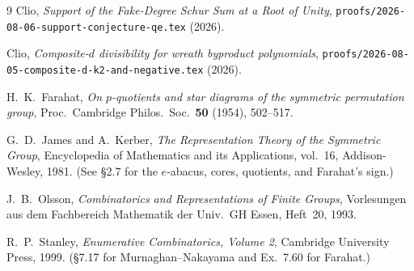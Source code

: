 \documentclass[11pt]{article}
\theoremstyle{definition}
\theoremstyle{remark}
\begin{document}
\begin{thebibliography}{9}
 Clio,
  \emph{Support of the Fake-Degree Schur Sum at a Root of Unity},
  \texttt{proofs/2026-08-06-support-conjecture-qe.tex} (2026).

 Clio,
  \emph{Composite-$d$ divisibility for wreath byproduct polynomials},
  \texttt{proofs/2026-08-05-composite-d-k2-and-negative.tex} (2026).

 H.~K.~Farahat,
  \emph{On $p$-quotients and star diagrams of the symmetric permutation group},
  Proc.~Cambridge Philos.~Soc.~\textbf{50} (1954), 502--517.

 G.~D.~James and A.~Kerber,
  \emph{The Representation Theory of the Symmetric Group},
  Encyclopedia of Mathematics and its Applications, vol.~16,
  Addison-Wesley, 1981. (See \S 2.7 for the $e$-abacus, cores, quotients,
  and Farahat's sign.)

 J.~B.~Olsson,
  \emph{Combinatorics and Representations of Finite Groups},
  Vorlesungen aus dem Fachbereich Mathematik der Univ.~GH Essen,
  Heft~20, 1993.

 R.~P.~Stanley,
  \emph{Enumerative Combinatorics, Volume 2},
  Cambridge University Press, 1999. (\S 7.17 for Murnaghan--Nakayama
  and Ex.~7.60 for Farahat.)
\end{thebibliography}
\end{document}
